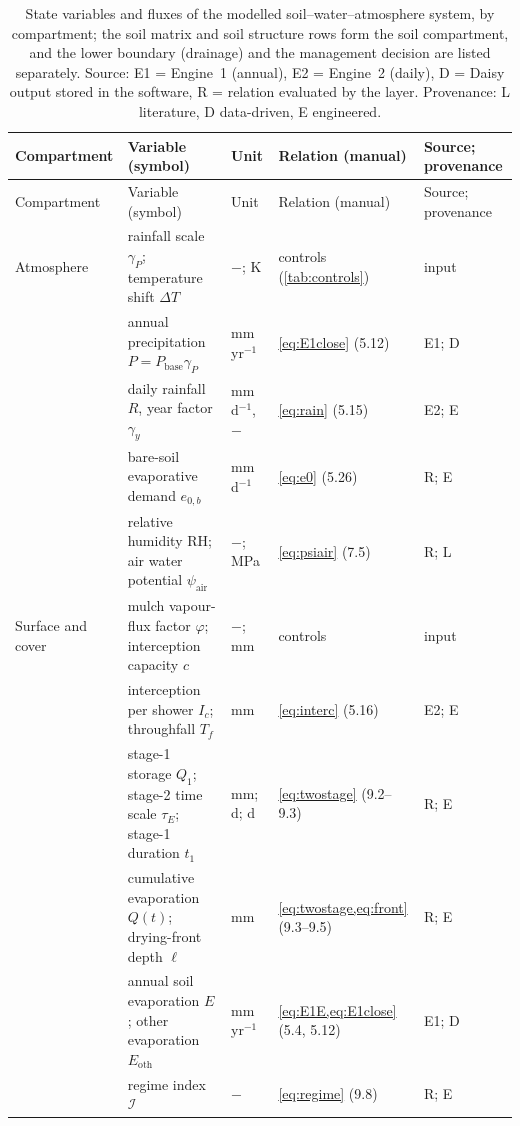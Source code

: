 \documentclass[preprint,12pt]{elsarticle}
\begin{document}
{\small
\begin{longtable}{>{\raggedright\arraybackslash}p{2.3cm}>{\raggedright\arraybackslash}p{3.8cm}>{\raggedright\arraybackslash}p{1.8cm}>{\raggedright\arraybackslash}p{4.0cm}>{\raggedright\arraybackslash}p{1.9cm}}
\caption{State variables and fluxes of the modelled soil--water--atmosphere system, by compartment; the soil matrix and soil structure rows form the soil compartment, and the lower boundary (drainage) and the management decision are listed separately. Source: E1 = Engine~1 (annual), E2 = Engine~2 (daily), D = Daisy output stored in the software, R = relation evaluated by the layer. Provenance: L literature, D data-driven, E engineered.}\label{tab:compartments}\\
\toprule
Compartment & Variable (symbol) & Unit & Relation (manual) & Source; provenance\\\midrule\endfirsthead
\toprule Compartment & Variable (symbol) & Unit & Relation (manual) & Source; provenance\\\midrule\endhead
Atmosphere & rainfall scale $\gamma_P$; temperature shift $\Delta T$ & $-$; K & controls (\cref{tab:controls}) & input\\
 & annual precipitation $P=P_{\mathrm{base}}\gamma_P$ & mm\,yr$^{-1}$ & \cref{eq:E1close} (5.12) & E1; D\\
 & daily rainfall $R$, year factor $\gamma_y$ & mm\,d$^{-1}$, $-$ & \cref{eq:rain} (5.15) & E2; E\\
 & bare-soil evaporative demand $e_{0,b}$ & mm\,d$^{-1}$ & \cref{eq:e0} (5.26) & R; E\\
 & relative humidity RH; air water potential $\psi_{\mathrm{air}}$ & $-$; MPa & \cref{eq:psiair} (7.5) & R; L\\
Surface and cover & mulch vapour-flux factor $\varphi$; interception capacity $c$ & $-$; mm & controls & input\\
 & interception per shower $I_c$; throughfall $T_f$ & mm & \cref{eq:interc} (5.16) & E2; E\\
 & stage-1 storage $Q_1$; stage-2 time scale $\tau_E$; stage-1 duration $t_1$ & mm; d; d & \cref{eq:twostage} (9.2--9.3) & R; E\\
 & cumulative evaporation $Q(t)$; drying-front depth $\ell$ & mm & \cref{eq:twostage,eq:front} (9.3--9.5) & R; E\\
 & annual soil evaporation $E$; other evaporation $E_{\mathrm{oth}}$ & mm\,yr$^{-1}$ & \cref{eq:E1E,eq:E1close} (5.4, 5.12) & E1; D\\
 & regime index $\mathcal I$ & $-$ & \cref{eq:regime} (9.8) & R; E\\

\end{longtable}}
\end{document}
